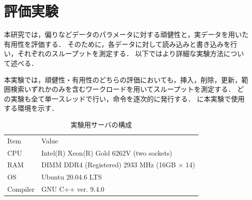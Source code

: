 \chapter{評価実験}

本研究では，偏りなどデータのパラメータに対する頑健性と，実データを用いた有用性を評価する．
そのために，各データに対して読み込みと書き込みを行い，それぞれのスループットを測定する．
以下ではより詳細な実験方法について述べる．

本実験では，頑健性・有用性のどちらの評価においても，挿入，削除，更新，範囲検索いずれかのみを含むワークロードを用いてスループットを測定する．
どの実験も全て単一スレッドで行い，命令を逐次的に発行する．
\Tab{\ref{tab:environment}}に本実験で使用する環境を示す．

\begin{table}[tb]
  \caption{実験用サーバの構成}
  \label{tab:environment}
  \centering
  \begin{tabular}{ll}
    \toprule
    Item     & Value                                              \\
    \cmidrule(r){1-1}
    \cmidrule(l){2-2}
    CPU      & Intel(R) Xeon(R) Gold 6262V (two sockets)          \\
    RAM      & DIMM DDR4 (Registered) 2933 MHz (16GB $\times$ 14) \\
    OS       & Ubuntu 20.04.6 LTS                                 \\
    Compiler & GNU C++ ver. 9.4.0                                 \\
    \bottomrule
  \end{tabular}
\end{table}

